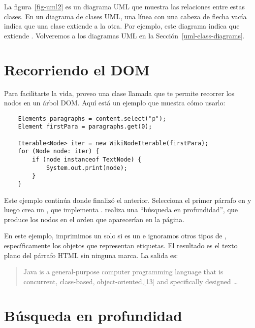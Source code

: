 \documentclass[12pt]{book}
\theoremstyle{exercise}
\begin{document}
La figura~\ref{fig-uml2} es un diagrama UML que muestra las relaciones entre
estas clases. En un diagrama de clases UML, una línea con una cabeza de flecha
vacía indica que una clase extiende a la otra. Por ejemplo, este
diagrama indica que  extiende .
Volveremos a los diagramas UML en la Sección~\ref{uml-class-diagrams}.



\section{Recorriendo el DOM}
\label{iterating-through-the-dom}

Para facilitarte la vida, proveo una clase llamada
 que te permite recorrer los nodos en un
árbol DOM. Aquí está un ejemplo que muestra cómo usarlo:


\begin{verbatim}
    Elements paragraphs = content.select("p");
    Element firstPara = paragraphs.get(0);

    Iterable<Node> iter = new WikiNodeIterable(firstPara);
    for (Node node: iter) {
        if (node instanceof TextNode) {
            System.out.print(node);
        }
    }
\end{verbatim}

Este ejemplo continúa donde finalizó el anterior. Selecciona el
primer párrafo en  y luego crea un
, que implementa
. 
 realiza una ``búsqueda en profundidad'', que
produce los nodos en el orden que aparecerían en la página.


En este ejemplo, imprimimos un  solo si es un
 e ignoramos otros tipos de , específicamente
los objetos  que representan etiquetas. El resultado es el
texto plano del párrafo HTML sin ninguna marca. La salida es:

\begin{quote}
Java is a general-purpose computer programming language that is
concurrent, class-based, object-oriented,{[}13{]} and specifically
designed \ldots
\end{quote}


\section{Búsqueda en profundidad}
\label{depth-first-search}
\end{document}
